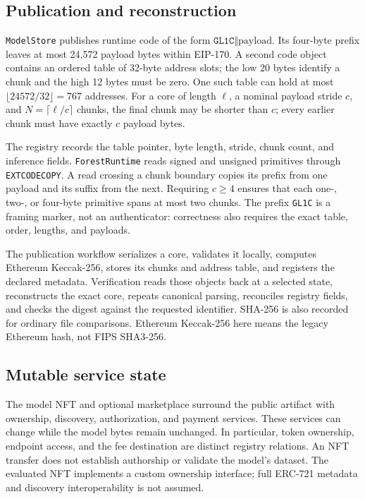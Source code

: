 \documentclass{ledger}
\newcommand{\codeword}[1]{\texttt{#1}}
\begin{document}
\subsection{Publication and reconstruction}

\codeword{ModelStore} publishes runtime code of the form
$\codeword{GL1C}\Vert\mathrm{payload}$. Its four-byte prefix leaves at most
24,572 payload bytes within EIP-170. A second code object contains an ordered
table of 32-byte address slots; the low 20 bytes identify a chunk and the high
12 bytes must be zero. One such table can hold at most
$\lfloor24572/32\rfloor=767$ addresses. For a core of length $\ell$, a nominal
payload stride $c$, and $N=\lceil\ell/c\rceil$ chunks, the final chunk may be
shorter than $c$; every earlier chunk must have exactly $c$ payload bytes.

The registry records the table pointer, byte length, stride, chunk count, and
inference fields. \codeword{ForestRuntime} reads signed and unsigned
primitives through \codeword{EXTCODECOPY}. A read crossing a chunk boundary
copies its prefix from one payload and its suffix from the next. Requiring
$c\ge4$ ensures that each one-, two-, or four-byte primitive spans at most
two chunks. The prefix \codeword{GL1C} is a framing marker, not an
authenticator: correctness also requires the exact table, order, lengths,
and payloads.

The publication workflow serializes a core, validates it locally, computes
Ethereum Keccak-256, stores its chunks and address table, and registers the
declared metadata. Verification reads those objects back at a selected state,
reconstructs the exact core, repeats canonical parsing, reconciles registry
fields, and checks the digest against the requested identifier. SHA-256 is
also recorded for ordinary file comparisons. Ethereum Keccak-256 here means
the legacy Ethereum hash, not FIPS SHA3-256.



\subsection{Mutable service state}

The model NFT and optional marketplace surround the public artifact with
ownership, discovery, authorization, and payment services. These services
can change while the model bytes remain unchanged. In particular, token
ownership, endpoint access, and the fee destination are distinct registry
relations. An NFT transfer does not establish authorship or validate the
model's dataset. The evaluated NFT implements a custom ownership interface;
full ERC-721 metadata and discovery interoperability is not assumed.
\cite{eip721}
\end{document}

